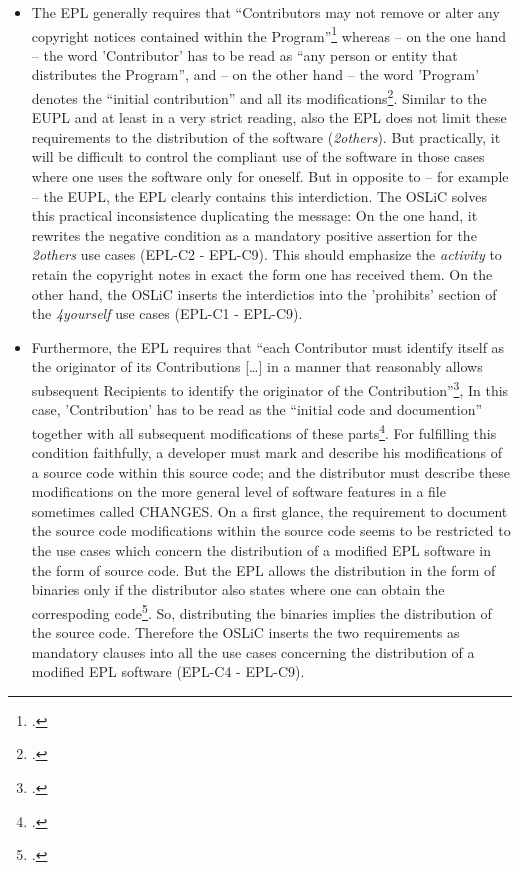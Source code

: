 \begin{itemize}

  \item The EPL generally requires that \enquote{Contributors may not remove or
  alter any copyright notices contained within the
  Program}\footcite[cf.][\nopage wp.\ §3]{Epl10OsiLicense2005a} whereas -- on the
  one hand -- the word 'Contributor' has to be read as \enquote{any person or
  entity that distributes the Program}, and -- on the other hand -- the word
  'Program' denotes the \enquote{initial contribution} and all its
  modifications\footcite[cf.][\nopage wp.\ §1]{Epl10OsiLicense2005a}. Similar to
  the EUPL and at least in a very strict reading, also the EPL does not limit
  these requirements to the distribution of the software (\emph{2others}). But
  practically, it will be difficult to control the compliant use of the software
  in those cases where one uses the software only for oneself. But in opposite
  to -- for example -- the EUPL, the EPL clearly contains this interdiction. The
  OSLiC solves this practical inconsistence duplicating the message: On the one
  hand, it rewrites the negative condition as a mandatory positive assertion for
  the \emph{2others} use cases (EPL-C2 - EPL-C9). This should emphasize the
  \emph{activity} to retain the copyright notes in exact the form one has
  received them. On the other hand, the OSLiC inserts the interdictios into the
  'prohibits' section of the \emph{4yourself} use cases (EPL-C1 - EPL-C9).
  
  \item Furthermore, the EPL requires that \enquote{each Contributor must
  identify itself as the originator of its Contributions [\ldots] in a manner
  that reasonably allows subsequent Recipients to identify the originator of the
  Contribution}\footcite[cf.][\nopage wp.\ §3]{Epl10OsiLicense2005a}, In this
  case, 'Contribution' has to be read as the \enquote{initial code and
  documention} together with all subsequent modifications of these
  parts\footcite[cf.][\nopage wp.\ §1]{Epl10OsiLicense2005a}. For fulfilling this
  condition faithfully, a developer must mark and describe his modifications of
  a source code within this source code; and the distributor must describe these
  modifications on the more general level of software features in a file
  sometimes called CHANGES. On a first glance, the requirement to document the
  source code modifications within the source code seems to be restricted to the
  use cases which concern the distribution of a modified EPL software in the
  form of source code. But the EPL allows the distribution in the form of
  binaries only if the distributor also states where one can obtain the
  correspoding code\footcite[cf.][\nopage wp.\ §3]{Epl10OsiLicense2005a}. So,
  distributing the binaries implies the distribution of the source code.
  Therefore the OSLiC inserts the two requirements as mandatory clauses into all
  the use cases concerning the distribution of a modified EPL software (EPL-C4 -
  EPL-C9).
  

\end{itemize}
